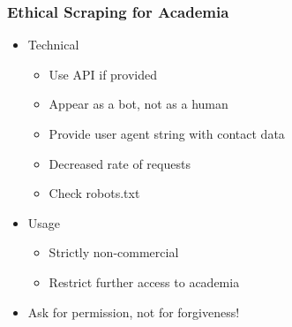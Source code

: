 \begin{frame}
\frametitle{Ethical Scraping for Academia}
\label{manners}
\begin{itemize}
    \item Technical
    \begin{itemize}
    \item Use API if provided
    \item Appear as a bot, not as a human
    \item Provide user agent string with contact data
    \item Decreased rate of requests
    \item Check robots.txt $\,$ \hyperlink{robots}{}
    \end{itemize}
    \end{itemize}
    \vspace{5pt}
    \begin{itemize}
    \item Usage
    \begin{itemize}
    \item Strictly non-commercial
    \item Restrict further access to academia
    \end{itemize}
\end{itemize}
    \vspace{5pt}
    \begin{itemize}
    \item Ask for permission, not for forgiveness!
    \end{itemize}
\end{frame}



